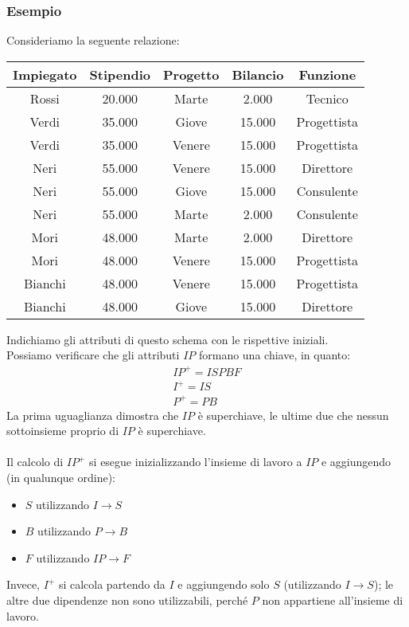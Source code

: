 \subsubsection{Esempio}
Consideriamo la seguente relazione:
    \begin{center}\begin{tabular}{|c|c|c|c|c|}\hline
        \textbf{Impiegato} & \textbf{Stipendio} & \textbf{Progetto} & 
        \textbf{Bilancio} & \textbf{Funzione} \\ \hline
        Rossi & 20.000 & Marte & 2.000 & Tecnico \\ \hline
        Verdi & 35.000 & Giove & 15.000 & Progettista \\ \hline
        Verdi & 35.000 & Venere & 15.000 & Progettista \\ \hline
        Neri & 55.000 & Venere & 15.000 & Direttore \\ \hline
        Neri & 55.000 & Giove & 15.000 & Consulente \\ \hline
        Neri & 55.000 & Marte & 2.000 & Consulente \\ \hline
        Mori & 48.000 & Marte & 2.000 & Direttore \\ \hline
        Mori & 48.000 & Venere & 15.000 & Progettista \\ \hline
        Bianchi & 48.000 & Venere & 15.000 & Progettista \\ \hline
        Bianchi & 48.000 & Giove & 15.000 & Direttore \\ \hline
    \end{tabular}\end{center}
Indichiamo gli attributi di questo schema con le rispettive iniziali.\\
Possiamo verificare che gli attributi $IP$ formano una chiave, in quanto:
    \begin{equation}\begin{aligned}
        IP^+ = ISPBF \\
        I^+ = IS\\
        P^+ = PB
    \end{aligned}\end{equation}
La prima uguaglianza dimostra che $IP$ è superchiave, le ultime due che nessun sottoinsieme proprio di $IP$ è superchiave.\\\\
Il calcolo di $IP^+$ si esegue inizializzando l'insieme di lavoro a $IP$ e aggiungendo (in qualunque ordine):
    \begin{itemize}
        \item{$S$ utilizzando $I \rightarrow S$}
        \item{$B$ utilizzando $P \rightarrow B$}
        \item{$F$ utilizzando $IP \rightarrow F$}
    \end{itemize}
Invece, $I^+$ si calcola partendo da $I$ e aggiungendo solo $S$ (utilizzando $I \rightarrow S$); le altre due dipendenze non sono utilizzabili, perché $P$ non appartiene all'insieme di lavoro.

